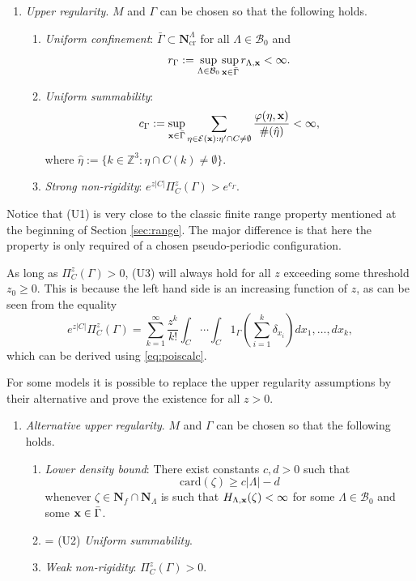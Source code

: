 \begin{enumerate}[\textbf{(U)}] 
	\item \textit{Upper regularity}. $M$ and $\Gamma$ can be chosen so that the following holds. 
		\begin{enumerate}[(U1)]
			\item \textit{Uniform confinement}: $\bar \Gamma \subset \mathbf N^\Lambda_\text{cr}$ for all $\Lambda \in \mathcal B_0$ and 
				\begin{equation}\label{eq:U1}r_\Gamma := \sup_{\Lambda\in\mathcal B_0}\sup_{{\mathbf{x}} \in \bar\Gamma} r_{\Lambda, {\mathbf{x}}} < \infty. \end{equation}
			\item \textit{Uniform summability}: 
			$$c_\Gamma := \sup_{{\mathbf{x}} \in \bar\Gamma}  \sum_{\eta \in \mathcal E({\mathbf{x}}): \eta' \cap C \neq \emptyset} \frac{\varphi(\eta,{\mathbf{x}})}{\#(\hat\eta)} < \infty,$$
where $\hat\eta := \{k \in \mathbb Z^3: \eta \cap C(k) \neq \emptyset\}$.
\item \textit{Strong non-rigidity}: $e^{z|C|} \Pi^z_C(\Gamma) > e^{c_\Gamma}$.
		\end{enumerate}
\end{enumerate}

Notice that (U1) is very close to the classic finite range property mentioned at the beginning of Section \ref{sec:range}. The major difference is that here the property is only required of a chosen pseudo-periodic configuration.


As long as $\Pi^z_C (\Gamma) >0$, (U3) will always hold for all $z$ exceeding some threshold $z_0 \geq 0$. This is because the left hand side is an increasing function of $z$, as can be seen from the equality 
$$e^{z|C|} \Pi^z_C(\Gamma) = \sum^\infty_{k=1} \frac{z^k}{k!} \int_C \cdots \int_C 1_{\Gamma} \left(\sum^k_{i=1} \delta_{x_i}\right) dx_1, \dots, dx_k,$$
which can be derived using \eqref{eq:poiscalc}. 



For some models it is possible to replace the upper regularity assumptions by their alternative and prove the existence for all $z>0$.

\begin{enumerate}[(\textbf{\^{U}})]
	\item \textit{Alternative upper regularity}. $M$ and $\Gamma$ can be chosen so that the following holds.
	\begin{enumerate}[(\^U1)]
		\item \textit{Lower density bound}: There exist constants $c,d > 0$ such that 
			$$\mathrm{card}(\zeta) \geq c|\Lambda| - d$$
			whenever $\zeta \in \mathbf N_f\cap\mathbf  N_\Lambda$ is such that $H_{\Lambda,{\mathbf{x}}}(\zeta)<\infty$ for some $\Lambda \in \mathcal B_0$ and some ${\mathbf{x}} \in \bar\Gamma$.
		\item = (U2) \textit{Uniform summability}.
		\item \textit{Weak non-rigidity}: $\Pi^z_C(\Gamma) > 0$.
	\end{enumerate}
\end{enumerate}






